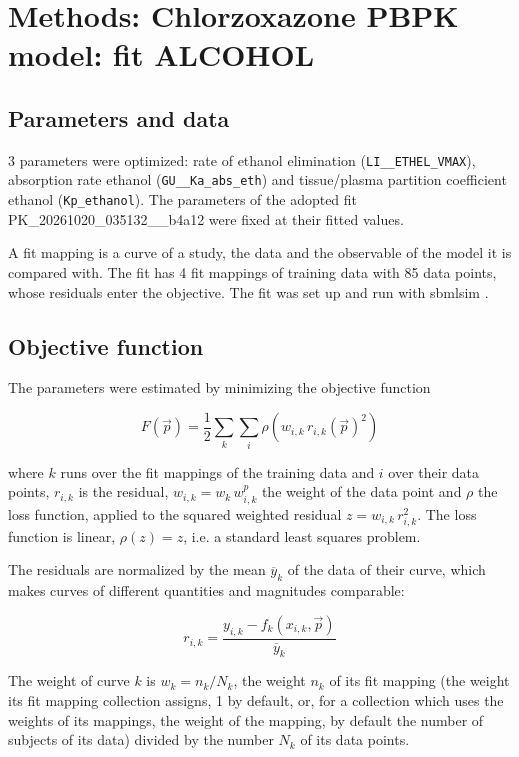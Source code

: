 \section{Methods: Chlorzoxazone PBPK model: fit ALCOHOL}

\subsection{Parameters and data}

3 parameters were optimized: rate of ethanol elimination (\texttt{LI\_\_ETHEL\_VMAX}), absorption rate ethanol (\texttt{GU\_\_Ka\_abs\_eth}) and tissue/plasma partition coefficient ethanol (\texttt{Kp\_ethanol}). The parameters of the adopted fit PK\_20261020\_035132\_\_b4a12 were fixed at their fitted values.

A fit mapping is a curve of a study, the data and the observable of the model it is compared with. The fit has 4 fit mappings of training data with 85 data points, whose residuals enter the objective. The fit was set up and run with sbmlsim \cite{Koenig2026_sbmlsim}.

\subsection{Objective function}

The parameters were estimated by minimizing the objective function

\begin{equation}
F(\vec{p}) = \frac{1}{2} \sum_{k} \sum_{i} \rho\left(w_{i,k}\, r_{i,k}(\vec{p})^2\right)
\end{equation}

where $k$ runs over the fit mappings of the training data and $i$ over their data points, $r_{i,k}$ is the residual, $w_{i,k} = w_k\, w^{p}_{i,k}$ the weight of the data point and $\rho$ the loss function, applied to the squared weighted residual $z = w_{i,k}\, r_{i,k}^2$. The loss function is linear, $\rho(z) = z$, i.e. a standard least squares problem.

The residuals are normalized by the mean $\overline{y}_k$ of the data of their curve, which makes curves of different quantities and magnitudes comparable:

\begin{equation}
r_{i,k} = \frac{y_{i,k} - f_k(x_{i,k}, \vec{p})}{\overline{y}_k}
\end{equation}

The weight of curve $k$ is $w_k = n_k / N_k$, the weight $n_k$ of its fit mapping (the weight its fit mapping collection assigns, 1 by default, or, for a collection which uses the weights of its mappings, the weight of the mapping, by default the number of subjects of its data) divided by the number $N_k$ of its data points.

